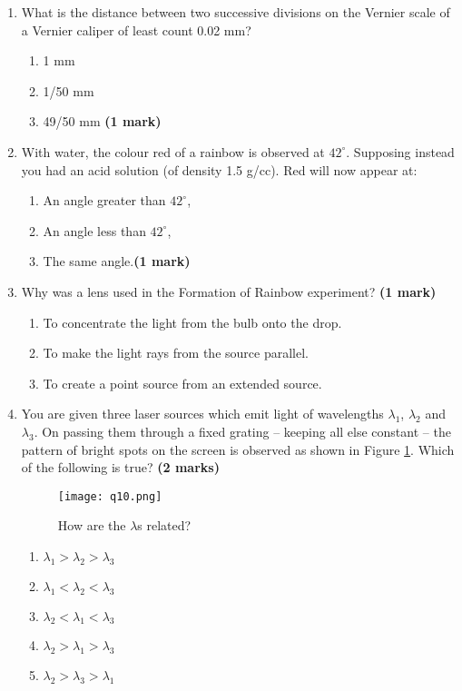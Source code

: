 \begin{enumerate}
\item What is the distance between two successive divisions on the Vernier scale of a Vernier caliper of least count 0.02 mm?
\begin{enumerate}
\item 1 mm
\item 1/50 mm
\item 49/50 mm \hfill \textbf{(1 mark)}
\end{enumerate}


\item With water, the colour red of a rainbow is observed at $42^\circ$. Supposing instead you had an acid solution (of density 1.5 g/cc). Red will now appear at:
\begin{enumerate}
\item An angle greater than $42^\circ$,
\item An angle less than $42^\circ$,
\item The same angle.\hfill \textbf{(1 mark)}
\end{enumerate}


\item Why was a lens used in the Formation of Rainbow experiment? \hfill \textbf{(1 mark)}

\begin{enumerate}
\item To concentrate the light from the bulb onto the drop.
\item To make the light rays from the source parallel.
\item To create a point source from an extended source.
\end{enumerate}
\newpage
\item You are given three laser sources which emit light of wavelengths $\lambda_1$, $\lambda_2$ and $\lambda_3$. On passing them through a fixed grating -- keeping all else constant -- the pattern of bright spots on the screen is observed as shown in Figure \ref{lambdaGratings}. Which of the following is true? \hfill \textbf{(2 marks)}


\renewcommand{\figurename}{\hspace{4cm} Figure}


\begin{figure}[!htb]\hspace{2cm}
\centering
\hspace{2cm}
\texttt{[image: q10.png]}%
\hfill\caption{How are the $\lambda$s related?}
\label{lambdaGratings}
\end{figure}
\vspace{-4cm}
\begin{enumerate}
\item $\lambda_1 > \lambda_2 > \lambda_3$
\item $\lambda_1 < \lambda_2 < \lambda_3$
\item $\lambda_2 < \lambda_1 < \lambda_3$
\item $\lambda_2 > \lambda_1 > \lambda_3$
\item $\lambda_2 > \lambda_3 > \lambda_1$
\end{enumerate}
\vspace{0.5cm}



\end{enumerate}
